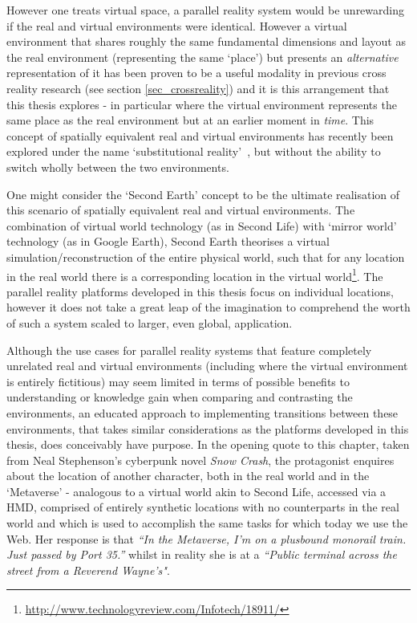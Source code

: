 However one treats virtual space, a parallel reality system would be unrewarding if the real and virtual environments were identical\turklevrfootnote{}. However a virtual environment that shares roughly the same fundamental dimensions and layout as the real environment (representing the same `place') but presents an \textit{alternative} representation of it has been proven to be a useful modality in previous cross reality research (see section \ref{sec_crossreality}) and it is this arrangement that this thesis explores - in particular where the virtual environment represents the same place as the real environment but at an earlier moment in \textit{time}. This concept of spatially equivalent real and virtual environments has recently been explored under the name `substitutional reality'~\cite{Simeone2015}, but without the ability to switch wholly between the two environments.

One might consider the `Second Earth' concept to be the ultimate realisation of this scenario of spatially equivalent real and virtual environments. The combination of virtual world technology (as in Second Life) with `mirror world' technology (as in Google Earth), Second Earth theorises a virtual simulation/reconstruction of the entire physical world, such that for any location in the real world there is a corresponding location in the virtual world\footnote{\url{http://www.technologyreview.com/Infotech/18911/}}. The parallel reality platforms developed in this thesis focus on individual locations, however it does not take a great leap of the imagination to comprehend the worth of such a system scaled to larger, even global, application.

Although the use cases for parallel reality systems that feature completely unrelated real and virtual environments (including where the virtual environment is entirely fictitious) may seem limited in terms of possible benefits to understanding or knowledge gain when comparing and contrasting the environments, an educated approach to implementing transitions between these environments, that takes similar considerations as the platforms developed in this thesis, does conceivably have purpose. In the opening quote to this chapter, taken from Neal Stephenson's cyberpunk novel \textit{Snow Crash}, the protagonist enquires about the location of another character, both in the real world and in the `Metaverse' - analogous to a virtual world akin to Second Life, accessed via a HMD, comprised of entirely synthetic locations with no counterparts in the real world and which is used to accomplish the same tasks for which today we use the Web. Her response is that \textit{``In  the Metaverse, I'm on a plusbound monorail train. Just passed by Port 35.''} whilst in reality she is at a \textit{``Public terminal across the street from a Reverend Wayne's"}.

